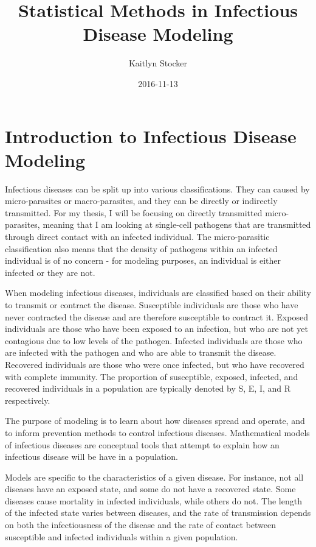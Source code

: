 \documentclass{article}
\title{Statistical Methods in Infectious Disease Modeling}
\date{2016-11-13}
\author{Kaitlyn Stocker}
\begin{document}
\maketitle
{}
\newpage
{}

\section{Introduction to Infectious Disease Modeling}
Infectious diseases can be split up into various classifications. They can caused by micro-parasites or macro-parasites, and they can be directly or indirectly transmitted. For my thesis, I will be focusing on directly transmitted micro-parasites, meaning that I am looking at single-cell pathogens that are transmitted through direct contact with an infected individual. The micro-parasitic classification also means that the density of pathogens within an infected individual is of no concern - for modeling purposes, an individual is either infected or they are not. 

When modeling infectious diseases, individuals are classified based on their ability to transmit or contract the disease. Susceptible individuals  are those who have never contracted the disease and are therefore susceptible to contract it. Exposed individuals are those who have been exposed to an infection, but who are not yet contagious due to low levels of the pathogen. Infected individuals are those who are infected with the pathogen and who are able to transmit the disease. Recovered individuals are those who were once infected, but who have recovered with complete immunity. The proportion of susceptible, exposed, infected, and recovered individuals in a population are typically denoted by S, E, I, and R respectively. 

The purpose of modeling is to learn about how diseases spread and operate, and to inform prevention methods to control infectious diseases. Mathematical models of infectious diseases are conceptual tools that attempt to explain how an infectious disease will be have in a population. 

Models are specific to the characteristics of a given disease. For instance, not all diseases have an exposed state, and some do not have a recovered state. Some diseases cause mortality in infected individuals, while others do not. The length of the infected state varies between diseases, and the rate of transmission depends on both the infectiousness of the disease and the rate of contact between susceptible and infected individuals within a given population. 
\end{document}
